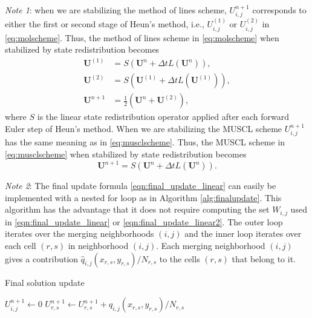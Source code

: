 \noindent\textit{Note 1}: when we are stabilizing the method of lines scheme, $U^{n+1}_{i,j}$ corresponds to either the first or second stage of Heun's method, i.e., $U^{(1)}_{i,j}$ or $U^{(2)}_{i,j}$ in \eqref{eq:molscheme}.  
Thus, the method of lines scheme in \eqref{eq:molscheme} when stabilized by state redistribution becomes
\begin{equation}\label{eq:molscheme_srd}
\begin{aligned}
\mathbf{U}^{(1)} &= S(\mathbf{U}^{n} + \Delta t L(\mathbf{U}^n)), \\
\mathbf{U}^{(2)} &= S(\mathbf{U}^{(1)} + \Delta t L(\mathbf{U}^{(1)})), \\
\mathbf{U}^{n+1} &= \frac{1}{2}( \mathbf{U}^{n} + \mathbf{U}^{(2)} ) ,	
\end{aligned}
\end{equation}
where $S$ is the linear state redistribution operator applied after each forward Euler step of Heun's method.
When we are stabilizing the MUSCL scheme $U^{n+1}_{i,j}$ has the same meaning as in \eqref{eq:musclscheme}.  Thus, the MUSCL scheme in \eqref{eq:musclscheme} when stabilized by state redistribution becomes
\begin{equation}\label{eq:musclscheme_srd}
\mathbf{U}^{n+1} = S(\mathbf{U}^{n} + \Delta t L(\mathbf{U}^{n})).
\end{equation}

\noindent\textit{Note 2}: The final update formula \eqref{eqn:final_update_linear} can easily be implemented with a 
nested for loop as in Algorithm \ref{alg:finalupdate}.  This algorithm has the advantage that it does not require computing the set $W_{i,j}$ used in \eqref{eqn:final_update_linear} or \eqref{eqn:final_update_linear2}.  The outer loop iterates over the merging neighborhoods $(i,j)$ and the inner loop iterates over each cell $(r,s)$ in neighborhood $(i,j)$.  Each merging neighborhood $(i,j)$ gives a contribution $ \hat{q}_{i,j}(x_{r,s}, y_{r,s})/N_{r,s} $ to the cells $(r,s)$ that belong to it. 
\begin{algorithm}[H]
		\caption{\sf Final solution update} \label{alg:finalupdate}
	\begin{algorithmic}
	\State $U^{n+1}_{i,j} \leftarrow 0$
	\EndFor
			\State $U^{n+1}_{r,s} \leftarrow U^{n+1}_{r,s} + \hat{q}_{i,j}(x_{r,s}, y_{r,s})/N_{r,s} $
		\EndFor
	\EndFor
	\end{algorithmic}
\end{algorithm}


